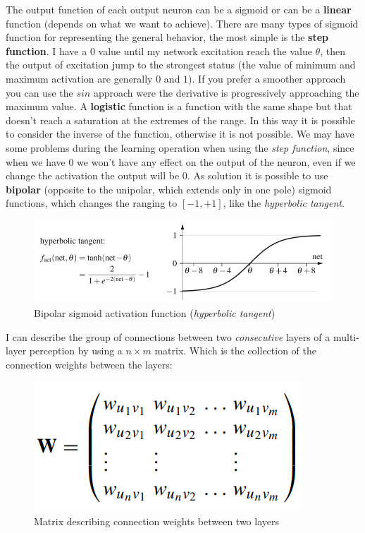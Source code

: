 \documentclass{article}
\begin{document}
The output function of each output neuron can be a sigmoid or can be a \textbf{linear}
function (depends on what we want to achieve). There are many types of sigmoid function for representing
the general behavior, the most simple is the \textbf{step function}.
\newline\newline
I have a $0$ value until my network excitation reach the value $\theta$, then the output
of excitation jump to the strongest status (the value of minimum and maximum activation are
generally $0$ and $1$).
\newline\newline
If you prefer a smoother approach you can use the $sin$ approach were the derivative
is progressively approaching the maximum value.
\newline\newline
A \textbf{logistic} function is a function with the same shape but that doesn't reach a saturation
at the extremes of the range. In this way it is possible to consider the inverse
of the function, otherwise it is not possible.
\newline\newline
We may have some problems during the learning operation when using the \textit{step function},
since when we have $0$ we won't have any effect on the output of the neuron,
even if we change the activation the output will be $0$. As solution it is possible to
use \textbf{bipolar} (opposite to the unipolar, which extends only in one pole)
sigmoid functions, which changes the ranging to $[-1,+1]$, like the \textit{hyperbolic tangent}.
\begin{figure}[H]
    \centering
    \includegraphics[scale=0.5]{images/hyperbolic_function.png}
    \caption{Bipolar sigmoid activation function (\textit{hyperbolic tangent})}
\end{figure}
I can describe the group of connections between two \textit{consecutive} layers of
a multi-layer perception by using a $n\times m$ matrix. Which is the collection of the
connection weights between the layers:
\begin{figure}[H]
    \centering
    \includegraphics[scale=0.5]{images/weight_matrix.png}
    \caption{Matrix describing connection weights between two layers}
\end{figure}
\end{document}
